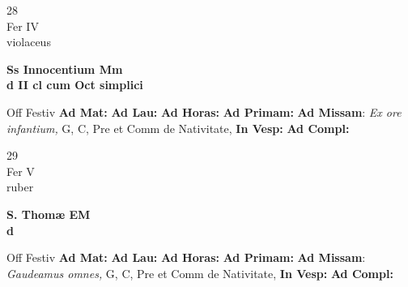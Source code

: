 \documentclass[10pt, openany]{book}
\begin{document}
    \begin{center}
        \begin{minipage}{3.5in}
            \vspace{2em}
            \begin{minipage}{0.5in}
                {\Huge 28} \\
                {\normalsize Fer IV} \\
                {\normalsize violaceus}
            \end{minipage}
            \begin{minipage}{3.0in}
                \textbf{ \large Ss Innocentium Mm \\
                \textnormal{\normalsize d II cl cum Oct simplici}} \\ 
            \end{minipage}
            \begin{justify}Off Festiv
                \textbf{Ad Mat: }
                \textbf{Ad Lau: }
                \textbf{Ad Horas: }
                \textbf{Ad Primam: }\textbf{Ad Missam}: \textit{Ex ore infantium,} G, C, Pre et Comm de Nativitate,  
                \textbf{In Vesp: }
                \textbf{Ad Compl: }
            \end{justify}
        \end{minipage}
    \end{center}

    \begin{center}
        \begin{minipage}{3.5in}
            \vspace{2em}
            \begin{minipage}{0.5in}
                {\Huge 29} \\
                {\normalsize Fer V} \\
                {\normalsize ruber}
            \end{minipage}
            \begin{minipage}{3.0in}
                \textbf{ \large S. Thomæ EM \\
                \textnormal{\normalsize d}} \\ 
            \end{minipage}
            \begin{justify}Off Festiv
                \textbf{Ad Mat: }
                \textbf{Ad Lau: }
                \textbf{Ad Horas: }
                \textbf{Ad Primam: }\textbf{Ad Missam}: \textit{Gaudeamus omnes,} G, C, Pre et Comm de Nativitate,  
                \textbf{In Vesp: }
                \textbf{Ad Compl: }
            \end{justify}
        \end{minipage}
    \end{center}
\end{document}
